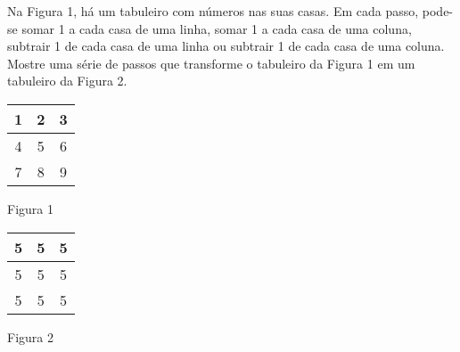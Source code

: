 Na Figura 1, há um tabuleiro com números nas suas casas. Em cada passo, pode-se somar 1 a cada casa de uma linha, somar 1 a cada casa de uma coluna, subtrair 1 de cada casa de uma linha ou subtrair 1 de cada casa de uma coluna. Mostre uma série de passos que transforme o tabuleiro da Figura 1 em um tabuleiro da Figura 2.

\vspace{1em}

\noindent
\begin{minipage}{.5\textwidth}
	\begin{center}
		\begin{tabular}{|c|c|c|}
			\hline
			1 & 2 & 3 \\
			\hline
			4 & 5 & 6 \\
			\hline
			7 & 8 & 9 \\
			\hline
		\end{tabular}

		\vspace{1ex} Figura 1
	\end{center}
\end{minipage}
\begin{minipage}{.5\textwidth}
	\begin{center}
		\begin{tabular}{|c|c|c|}
			\hline
			5 & 5 & 5 \\
			\hline
			5 & 5 & 5 \\
			\hline
			5 & 5 & 5 \\
			\hline
		\end{tabular}

		\vspace{1ex} Figura 2
	\end{center}
\end{minipage}
